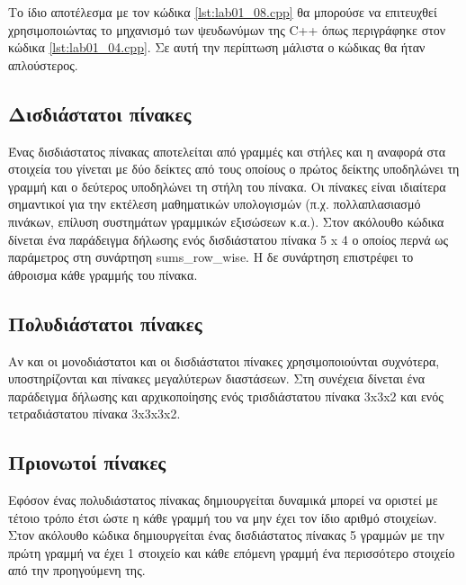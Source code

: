 



Το ίδιο αποτέλεσμα με τον κώδικα \ref{lst:lab01_08.cpp} θα μπορούσε να επιτευχθεί χρησιμοποιώντας το μηχανισμό των ψευδωνύμων της C++ όπως περιγράφηκε στον κώδικα \ref{lst:lab01_04.cpp}. Σε αυτή την περίπτωση μάλιστα ο κώδικας θα ήταν απλούστερος.

\subsection{Δισδιάστατοι πίνακες}
Ένας δισδιάστατος πίνακας αποτελείται από γραμμές και στήλες και η αναφορά στα στοιχεία του γίνεται με δύο  δείκτες από τους οποίους ο πρώτος δείκτης υποδηλώνει τη γραμμή και ο δεύτερος υποδηλώνει τη στήλη του πίνακα. Οι πίνακες είναι ιδιαίτερα σημαντικοί για την εκτέλεση μαθηματικών υπολογισμών (π.χ. πολλαπλασιασμό πινάκων, επίλυση συστημάτων γραμμικών εξισώσεων κ.α.). Στον ακόλουθο κώδικα δίνεται ένα παράδειγμα δήλωσης ενός δισδιάστατου πίνακα 5 x 4 ο οποίος περνά ως παράμετρος στη συνάρτηση sums\_row\_wise. Η δε συνάρτηση επιστρέφει το άθροισμα κάθε γραμμής του πίνακα.






\subsection{Πολυδιάστατοι πίνακες}
Αν και οι μονοδιάστατοι και οι δισδιάστατοι πίνακες χρησιμοποιούνται συχνότερα, υποστηρίζονται και πίνακες μεγαλύτερων διαστάσεων. Στη συνέχεια δίνεται ένα παράδειγμα δήλωσης και αρχικοποίησης ενός τρισδιάστατου πίνακα 3x3x2 και ενός τετραδιάστατου πίνακα 3x3x3x2.




\subsection{Πριονωτοί πίνακες}
Εφόσον ένας πολυδιάστατος πίνακας δημιουργείται δυναμικά μπορεί να οριστεί με τέτοιο τρόπο έτσι ώστε η κάθε γραμμή του να μην έχει τον ίδιο αριθμό στοιχείων. Στον ακόλουθο κώδικα δημιουργείται ένας δισδιάστατος πίνακας 5 γραμμών με την πρώτη γραμμή να έχει 1 στοιχείο και κάθε επόμενη γραμμή ένα περισσότερο στοιχείο από την προηγούμενη της.

